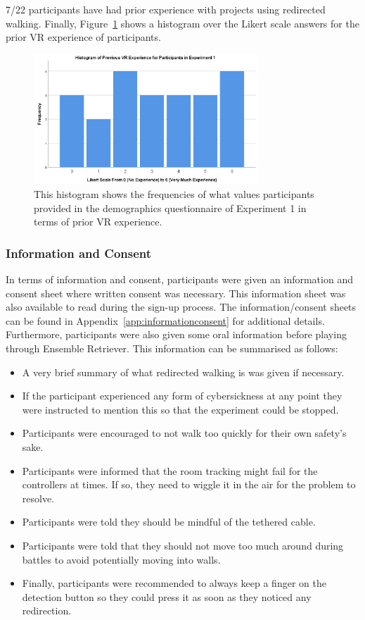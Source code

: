 7/22 participants have had prior experience with projects using redirected walking. Finally, Figure~\ref{fig:ex1PriorVRExperience} shows a histogram over the Likert scale answers for the prior VR experience of participants. 

\begin{figure}[tbph]
    \centering
    \includegraphics[width=0.75\textwidth]{figures/graphs/Experiment1VRExperienceHisto.png}
    \caption[Histogram on Prior VR Experience of Participants in Experiment 1]{This histogram shows the frequencies of what values participants provided in the demographics questionnaire of Experiment 1 in terms of prior VR experience.}
    \label{fig:ex1PriorVRExperience}
\end{figure}

\subsubsection{Information and Consent}
In terms of information and consent, participants were given an information and consent sheet where written consent was necessary. This information sheet was also available to read during the sign-up process. The information/consent sheets can be found in Appendix~\ref{app:informationconsent} for additional details. Furthermore, participants were also given some oral information before playing through Ensemble Retriever. This information can be summarised as follows:

\begin{itemize}
    \item A very brief summary of what redirected walking is was given if necessary.
    \item If the participant experienced any form of cybersickness at any point they were instructed to mention this so that the experiment could be stopped.
    \item Participants were encouraged to not walk too quickly for their own safety's sake.
    \item Participants were informed that the room tracking might fail for the controllers at times. If so, they need to wiggle it in the air for the problem to resolve.
    \item Participants were told they should be mindful of the tethered cable.
    \item Participants were told that they should not move too much around during battles to avoid potentially moving into walls. 
    \item Finally, participants were recommended to always keep a finger on the detection button so they could press it as soon as they noticed any redirection.
\end{itemize}

